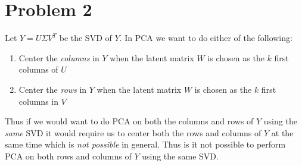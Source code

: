 \section*{Problem 2}

Let $Y = U \Sigma V^T$ be the SVD of $Y$. In PCA we want to do either of the following:

\begin{enumerate}
  \item Center the \textit{columns} in $Y$ when the latent matrix $W$ is chosen as the $k$ first columns of $U$
  \item Center the \textit{rows} in $Y$ when the latent matrix $W$ is chosen as the $k$ first columns in $V$
\end{enumerate}

Thus if we would want to do PCA on both the columns and rows of $Y$ using the \textit{same} SVD it would require us to center both the rows and columns of $Y$ at the same time which is \textit{not possible} in general. Thus is it not possible to perform PCA on both rows and columns of $Y$ using the same SVD.

